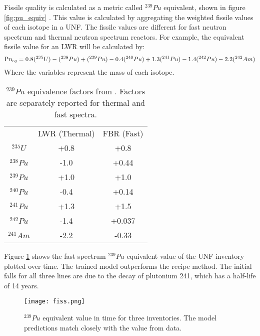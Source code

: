 Fissile quality is calculated as a metric called
$^{239}Pu$ equivalent, shown in figure \ref{fig:pu_equiv} \cite{anon_plutonium_1989}. This value is
calculated by aggregating the weighted fissile
values of each isotope in a \gls{UNF}. The fissile
values are different for fast neutron spectrum 
and thermal neutron spectrum reactors.  
For example, the equivalent fissile value for
an \gls{LWR} will be calculated by:
\begin{equation}
\text{Pu}_{eq} = 0.8(^{235}U) - (^{238}Pu) + (^{239}Pu) - 0.4(^{240}Pu) \\
            + 1.3(^{241}Pu) - 1.4(^{242}Pu) - 2.2(^{242}Am)
\end{equation}
Where the variables represent the mass of each isotope.



\begin{table}[h]
    \centering
    \begin{tabular}{ccc}
        \hline
        & LWR (Thermal) & \gls{FBR} (Fast) \\
        $^{235}U$ & +0.8& +0.8\\
        $^{238}Pu$ & -1.0& +0.44\\
        $^{239}Pu$ & +1.0& +1.0\\
        $^{240}Pu$ & -0.4& +0.14\\
        $^{241}Pu$ & +1.3& +1.5 \\
        $^{242}Pu$ & -1.4& +0.037\\
        $^{241}Am$ & -2.2& -0.33\\
    \end{tabular}
    \caption{$^{239}Pu$ equivalence factors from \cite{anon_plutoinum_1989}.
             Factors are separately reported for thermal and fast spectra.}
    \label{tab:wm}
\end{table}


Figure \ref{fig:fiss} shows the fast spectrum $^{239}Pu$ equivalent
value of the \gls{UNF} inventory plotted over time.
The trained model outperforms the recipe method. The
initial falls for all three lines are due to the
decay of plutonium 241, which has a half-life of
14 years.


\begin{figure}
    \centering
    \texttt{[image: fiss.png]}
    \caption{$^{239}Pu$ equivalent value in time for three
             inventories. The model predictions match closely
             with the value from data.}
    \label{fig:fiss}
\end{figure}




